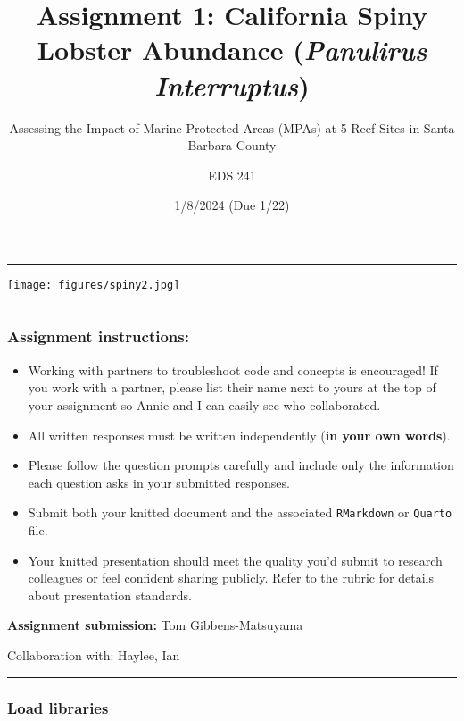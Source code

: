 \documentclass[
]{article}
\title{Assignment 1: California Spiny Lobster Abundance (\emph{Panulirus
Interruptus})}
\subtitle{Assessing the Impact of Marine Protected Areas (MPAs) at 5
Reef Sites in Santa Barbara County}
\author{EDS 241}
\date{1/8/2024 (Due 1/22)}
\begin{document}
\maketitle

\begin{center}\rule{0.5\linewidth}{0.5pt}\end{center}

\texttt{[image: figures/spiny2.jpg]}

\begin{center}\rule{0.5\linewidth}{0.5pt}\end{center}

\hypertarget{assignment-instructions}{%
\subsubsection{Assignment instructions:}\label{assignment-instructions}}

\begin{itemize}
\item
  Working with partners to troubleshoot code and concepts is encouraged!
  If you work with a partner, please list their name next to yours at
  the top of your assignment so Annie and I can easily see who
  collaborated.
\item
  All written responses must be written independently (\textbf{in your
  own words}).
\item
  Please follow the question prompts carefully and include only the
  information each question asks in your submitted responses.
\item
  Submit both your knitted document and the associated
  \texttt{RMarkdown} or \texttt{Quarto} file.
\item
  Your knitted presentation should meet the quality you'd submit to
  research colleagues or feel confident sharing publicly. Refer to the
  rubric for details about presentation standards.
\end{itemize}

\textbf{Assignment submission:} Tom Gibbens-Matsuyama

Collaboration with: Haylee, Ian

\begin{center}\rule{0.5\linewidth}{0.5pt}\end{center}

\hypertarget{load-libraries}{%
\subsubsection{Load libraries}\label{load-libraries}}
\end{document}
